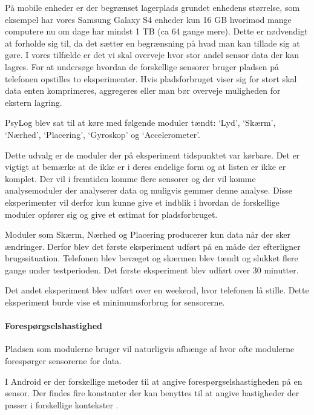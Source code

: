 På mobile enheder er der begrænset lagerplads grundet enhedens størrelse, som eksempel har vores Samsung Galaxy S4 enheder kun 16 GB hvorimod mange computere nu om dage har mindst 1 TB (ca 64 gange mere).
Dette er nødvendigt at forholde sig til, da det sætter en begrænsning på hvad man kan tillade sig at gøre.
I vores tilfælde er det vi skal overveje hvor stor andel sensor data der kan lagres.
For at undersøge hvordan de forskellige sensorer bruger pladsen på telefonen opstilles to eksperimenter.
Hvis pladsforbruget viser sig for stort skal data enten komprimeres, aggregeres eller man bør overveje muligheden for ekstern lagring.

PsyLog blev sat til at køre med følgende moduler tændt: `Lyd', `Skærm', `Nærhed', `Placering', `Gyroskop' og `Accelerometer'.

Dette udvalg er de moduler der på eksperiment tidspunktet var kørbare.
Det er vigtigt at bemærke at de ikke er i deres endelige form og at listen er ikke er komplet.
Der vil i fremtiden komme flere sensorer og der vil komme analysemoduler der analyserer data og muligvis gemmer denne analyse.
Disse eksperimenter vil derfor kun kunne give et indblik i hvordan de forskellige moduler opfører sig og give et estimat for pladsforbruget.

Moduler som Skærm, Nærhed og Placering producerer kun data når der sker ændringer. 
Derfor blev det første eksperiment udført på en måde der efterligner brugssituation. 
Telefonen blev bevæget og skærmen blev tændt og slukket flere gange under testperioden.
Det første eksperiment blev udført over 30 minutter.

Det andet eksperiment blev udført over en weekend, hvor telefonen lå stille.
Dette eksperiment burde vise et minimumsforbrug for sensorerne.

\paragraph{Forespørgselshastighed}
Pladsen som modulerne bruger vil naturligvis afhænge af hvor ofte modulerne forespørger sensorerne for data.

I Android er der forskellige metoder til at angive forespørgselshastigheden på en sensor.
Der findes fire konstanter der kan benyttes til at angive hastigheder der passer i forskellige kontekster \cite{sensormonitor}.

